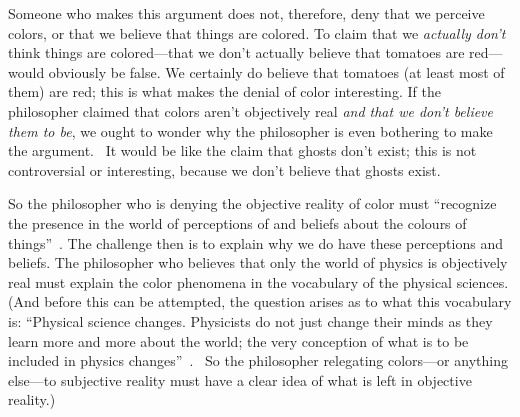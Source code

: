 \documentclass[11pt]{article}
\begin{document}
\begin{spacing}{1.5}
Someone who makes this argument does not, therefore, deny that we perceive colors, or that we believe that things are colored. To claim that we {\em actually don't} think things are colored---that we don't actually believe that tomatoes are red---would obviously be false. We certainly do believe that tomatoes (at least most of them) are red; this is what makes the denial of color interesting. If the philosopher claimed that colors aren't objectively real {\em and that we don't believe them to be}, we ought to wonder why the philosopher is even bothering to make the argument.%
%
%
\ It would be like the claim that ghosts don't exist; this is not controversial or interesting, because we don't believe that ghosts exist.

So the philosopher who is denying the objective reality of color must ``recognize the presence in the world of perceptions of and beliefs about the colours of things''~\citep[199]{stroud2000a}. The challenge then is to explain why we do have these perceptions and beliefs. The philosopher who believes that only the world of physics is objectively real must explain the color phenomena in the vocabulary of the physical sciences. (And before this can be attempted, the question arises as to what this vocabulary is: ``Physical science changes. Physicists do not just change their minds as they learn more and more about the world; the very conception of what is to be included in physics changes''~\citep[53]{stroud2000a}.%
%
%
\ So the philosopher relegating colors---or anything else---to subjective reality must have a clear idea of what is left in objective reality.)%


\end{spacing}
\end{document}
